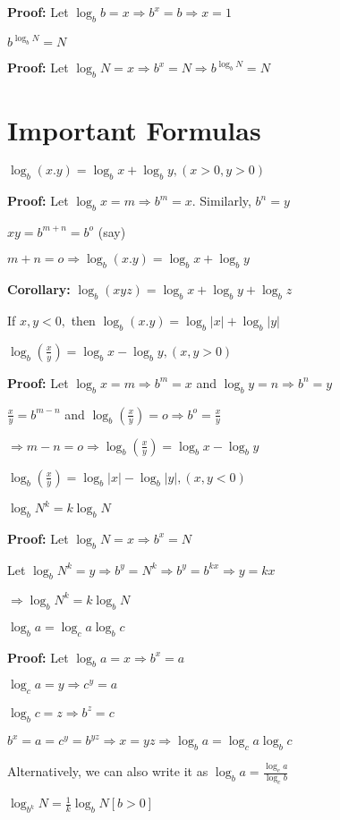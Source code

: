   {\bf Proof:} Let $\log_b b = x \Rightarrow b^x = b \Rightarrow x = 1$
\item $b^{\log_b N} = N$

  {\bf Proof:} Let $\log_b N = x\Rightarrow b^x = N \Rightarrow b^{\log_b N} = N$
\stopitemize
\section{Important Formulas}
\startitemize[n]
\item $\log_b(x.y) = \log_bx + \log_by, (x>0, y>0)$

  {\bf Proof:} Let $\log_bx = m \Rightarrow b^m = x$. Similarly, $b^n = y$

  $xy = b^{m + n} = b^o$ (say)

  $m + n = o \Rightarrow \log_b(x.y) = \log_bx + \log_by$

  {\bf Corollary:} $\log_b(xyz) = \log_bx + \log_by + \log_bz$

  If $x, y < 0,$ then $\log_b(x.y) = \log_b|x| + \log_b|y|$
\item $\log_b\left(\frac{x}{y}\right) = \log_b x - \log_b y, (x, y > 0)$

  {\bf Proof:} Let $\log_bx = m \Rightarrow b^m = x$ and $\log_by = n \Rightarrow b^n = y$

  $\frac{x}{y} = b^{m - n}$ and $\log_b\left(\frac{x}{y}\right) = o \Rightarrow b^o = \frac{x}{y}$

  $\Rightarrow m - n = o \Rightarrow \log_b\left(\frac{x}{y}\right) = \log_b x - \log_b y$

  $\log_b\left(\frac{x}{y}\right) = \log_b|x| - \log_b|y|, (x, y < 0)$
\item $\log_bN^k = k\log_b N$

  {\bf Proof:} Let $\log_bN = x \Rightarrow b^x = N$

  Let $\log_bN^k = y \Rightarrow b^y = N^k \Rightarrow b^y = b^{kx} \Rightarrow y = kx$

  $\Rightarrow \log_bN^k = k\log_b N$
\item $\log_ba = \log_ca\log_bc$

  {\bf Proof:} Let $\log_ba = x \Rightarrow b^x = a$

  $\log_ca = y \Rightarrow c^y = a$

  $\log_bc = z \Rightarrow b^z = c$

  $b^x = a = c^y = b^{yz} \Rightarrow x = yz \Rightarrow \log_ba = \log_ca\log_bc$

  Alternatively, we can also write it as $\log_ba = \frac{\log_ca}{\log_cb}$
\item $\log_{b^k}N = \frac{1}{k}\log_bN[b > 0]$

